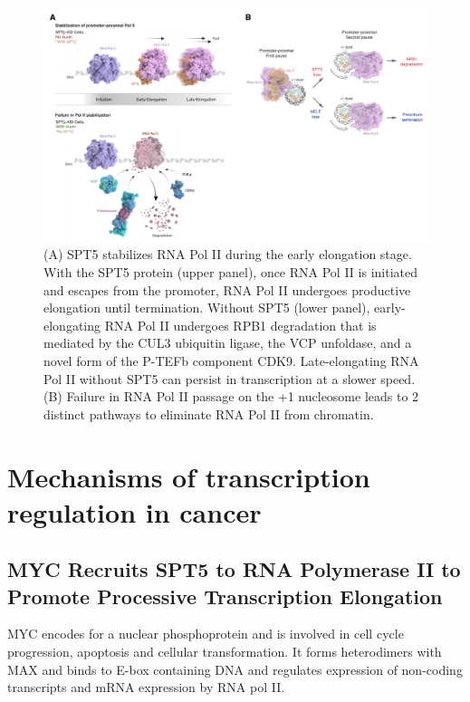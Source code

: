 \begin{figure}
\centering
\includegraphics[width=\textwidth]{../_resources/Screen_Shot_2022-12-19_at_17-00-41.png}
\caption{(A) SPT5 stabilizes RNA Pol II during the early elongation stage. With the SPT5 protein (upper panel), once RNA Pol II is initiated and escapes from the promoter, RNA Pol II undergoes productive elongation until termination. Without SPT5 (lower panel), early-elongating RNA Pol II undergoes RPB1 degradation that is mediated by the CUL3 ubiquitin ligase, the VCP unfoldase, and a novel form of the P-TEFb component CDK9. Late-elongating RNA Pol II without SPT5 can persist in transcription at a slower speed.
(B) Failure in RNA Pol II passage on the +1 nucleosome leads to 2 distinct pathways to eliminate RNA Pol II from chromatin.}
\end{figure}

\section{Mechanisms of transcription regulation in cancer}

\subsection{MYC Recruits SPT5 to RNA Polymerase II to Promote Processive Transcription Elongation}

MYC encodes for a nuclear phosphoprotein and is involved in cell cycle progression, apoptosis and cellular transformation. It forms heterodimers with MAX and binds to E-box containing DNA and regulates expression of non-coding transcripts and mRNA expression by RNA pol II.


